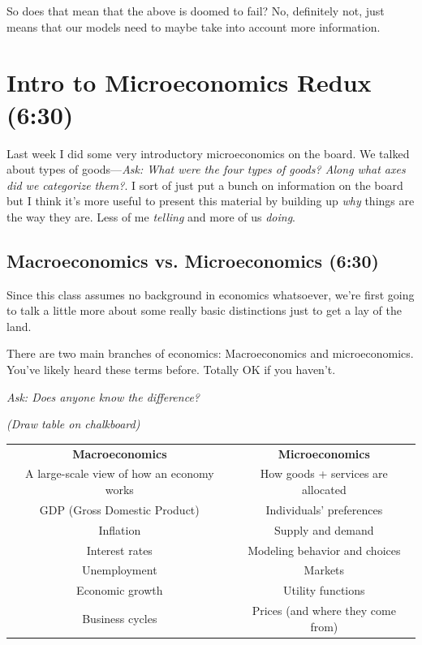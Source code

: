 \documentclass[11pt]{article}
\begin{document}
So does that mean that the above is doomed to fail? No, definitely not, just means that our models need to maybe take into account more information.


\section{Intro to Microeconomics Redux (6:30)}

Last week I did some very introductory microeconomics on the board. We talked about types of goods---{\it Ask: What were the four types of goods? Along what axes did we categorize them?}. I sort of just put a bunch on information on the board but I think it's more useful to present this material by building up {\it why} things are the way they are. Less of me {\it telling} and more of us {\it doing}.

\subsection{Macroeconomics vs. Microeconomics (6:30)}

Since this class assumes no background in economics whatsoever, we're first going to talk a little more about some really basic distinctions just to get a lay of the land. 

There are two main branches of economics: Macroeconomics and microeconomics. You've likely heard these terms before. Totally OK if you haven't.

{\it Ask: Does anyone know the difference?}

{\it (Draw table on chalkboard)}

\begin{table}[H]
    \centering
    \begin{tabular}{c|c}
        \hline
        {\bf Macroeconomics} & {\bf Microeconomics} \\
        A large-scale view of how an economy works & How goods + services are allocated   \\ 
        \hline
        GDP (Gross Domestic Product) & Individuals' preferences \\
        Inflation & Supply and demand\\
        Interest rates & Modeling behavior and choices\\
        Unemployment & Markets \\ 
        Economic growth & Utility functions \\ 
        Business cycles & Prices (and where they come from)\\ 

        \hline
    \end{tabular}
\end{table}
        
\end{document}

